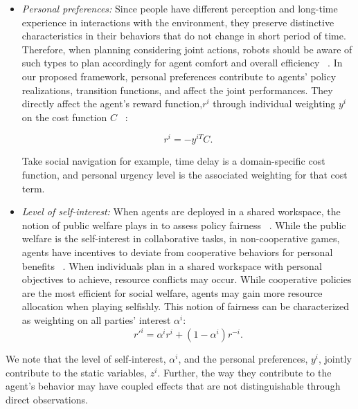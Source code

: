 \documentclass[letterpaper, 10 pt, conference]{ieeeconf}  %
\begin{document}
\begin{itemize}
	\item \textit{Personal preferences:} Since people have different perception 
    and long-time experience in interactions with the environment, they 
    preserve distinctive characteristics in their behaviors that do not change 
    in short period of time. Therefore, when planning considering joint 
    actions, robots should be aware of such types to plan accordingly for 
    agent comfort and overall efficiency ~\cite{gombolay2015coordination}. In 
    our proposed framework, personal preferences contribute to agents' policy 
    realizations, transition functions, and affect the joint performances. 
    They directly affect the agent's reward function,$r^i$ through individual 
    weighting $y^i$ on the cost function $C$ ~\cite{dorsa2017active}:
	
    \begin{equation}
	r^i = -y^{iT}C. 
	\end{equation}
	
	Take social navigation for 
    example, time delay is a domain-specific cost function, and personal 
    urgency level is the associated weighting for that cost term.
	\item \textit{Level of self-interest:} When agents are deployed in a shared workspace, the notion of public welfare plays in to assess policy fairness ~\cite{fehr2004social}. While the public welfare is the self-interest in collaborative tasks, in non-cooperative games, agents have incentives to deviate from cooperative behaviors for personal benefits ~\cite{fujiwara2015non}. When individuals plan in a shared workspace with personal objectives to achieve, resource conflicts may occur. 
	While cooperative policies are the most efficient for social welfare, agents may gain more resource allocation when playing selfishly. This notion of fairness can be characterized as weighting on all parties' interest $\alpha^i$:
	\begin{equation}
    r'^{i} = \alpha^ir^i+ ({1-\alpha^i}) r^{-i}.
	\end{equation}
	
\end{itemize}

We note that the level of self-interest, $\alpha^i$, and the personal 
preferences, $y^i$, jointly contribute to the static variables, $z^i$. 
Further, the way they contribute to the agent's behavior may have coupled 
effects that are not distinguishable through direct observations.
\end{document}
